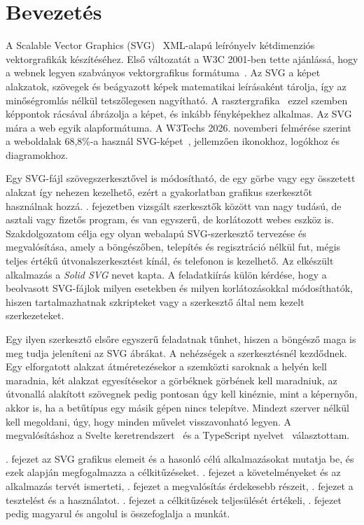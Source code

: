 \chapter{Bevezetés}
\label{ch:intro}

A Scalable Vector Graphics (SVG)~\cite{w3c-svg} XML-alapú leírónyelv kétdimenziós vektorgrafikák készítéséhez. Első változatát a W3C 2001-ben tette ajánlássá, hogy a webnek legyen szabványos vektorgrafikus formátuma~\cite{w3c-svg10}. Az SVG a képet alakzatok, szövegek és beágyazott képek matematikai leírásaként tárolja, így az minőségromlás nélkül tetszőlegesen nagyítható. A rasztergrafika~\cite{raster-graphics} ezzel szemben képpontok rácsával ábrázolja a képet, és inkább fényképekhez alkalmas. Az SVG mára a web egyik alapformátuma. A W3Techs 2026. novemberi felmérése szerint a weboldalak 68,8\%-a használ SVG-képet~\cite{w3techs-svg}, jellemzően ikonokhoz, logókhoz és diagramokhoz.

\medskip
Egy SVG-fájl szövegszerkesztővel is módosítható, de egy görbe vagy egy összetett alakzat így nehezen kezelhető, ezért a gyakorlatban grafikus szerkesztőt használnak hozzá. . fejezetben vizsgált szerkesztők között van nagy tudású, de asztali vagy fizetős program, és van egyszerű, de korlátozott webes eszköz is. Szakdolgozatom célja egy olyan webalapú SVG-szerkesztő tervezése és megvalósítása, amely a böngészőben, telepítés és regisztráció nélkül fut, mégis teljes értékű útvonalszerkesztést kínál, és telefonon is kezelhető. Az elkészült alkalmazás a \textit{Solid SVG} nevet kapta. A feladatkiírás külön kérdése, hogy a beolvasott SVG-fájlok milyen esetekben és milyen korlátozásokkal módosíthatók, hiszen tartalmazhatnak szkripteket vagy a szerkesztő által nem kezelt szerkezeteket.

\medskip
Egy ilyen szerkesztő elsőre egyszerű feladatnak tűnhet, hiszen a böngésző maga is meg tudja jeleníteni az SVG ábrákat. A nehézségek a szerkesztésnél kezdődnek. Egy elforgatott alakzat átméretezésekor a szemközti saroknak a helyén kell maradnia, két alakzat egyesítésekor a görbéknek görbének kell maradniuk, az útvonallá alakított szövegnek pedig pontosan úgy kell kinéznie, mint a képernyőn, akkor is, ha a betűtípus egy másik gépen nincs telepítve. Mindezt szerver nélkül kell megoldani, úgy, hogy minden művelet visszavonható legyen. A megvalósításhoz a Svelte keretrendszert~\cite{svelte-overview} és a TypeScript nyelvet~\cite{mdn-ts} választottam.

\medskip
{}. fejezet az SVG grafikus elemeit és a hasonló célú alkalmazásokat mutatja be, és ezek alapján megfogalmazza a célkitűzéseket. . fejezet a követelményeket és az alkalmazás tervét ismerteti, . fejezet a megvalósítás érdekesebb részeit, . fejezet a tesztelést és a használatot. . fejezet a célkitűzések teljesülését értékeli, . fejezet pedig magyarul és angolul is összefoglalja a munkát.
